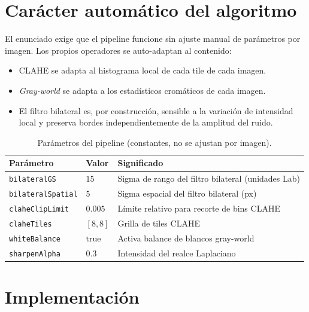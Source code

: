 \documentclass[11pt,a4paper]{article}
\begin{document}
\section{Carácter automático del algoritmo}
\label{sec:auto}

El enunciado exige que el pipeline funcione sin ajuste manual de parámetros por
imagen. Los propios operadores se auto-adaptan al contenido:

\begin{itemize}
    \item CLAHE se adapta al histograma local de cada tile de cada imagen.
    \item \emph{Gray-world} se adapta a los estadísticos cromáticos de cada imagen.
    \item El filtro bilateral es, por construcción, sensible a la variación de intensidad
          local y preserva bordes independientemente de la amplitud del ruido.
\end{itemize}

\begin{table}[H]
\centering
\caption{Parámetros del pipeline (constantes, no se ajustan por imagen).}
\label{tab:params}
\begin{tabular}{@{}lll@{}}
\toprule
Parámetro & Valor & Significado \\
\midrule
\texttt{bilateralGS}      & \(15\)       & Sigma de rango del filtro bilateral (unidades Lab) \\
\texttt{bilateralSpatial} & \(5\)        & Sigma espacial del filtro bilateral (px) \\
\texttt{claheClipLimit}   & \(0.005\)    & Límite relativo para recorte de bins CLAHE \\
\texttt{claheTiles}       & \([8,8]\)    & Grilla de tiles CLAHE \\
\texttt{whiteBalance}     & \(\text{true}\) & Activa balance de blancos gray-world \\
\texttt{sharpenAlpha}     & \(0.3\)      & Intensidad del realce Laplaciano \\
\bottomrule
\end{tabular}
\end{table}

\section{Implementación}
\label{sec:impl}
\end{document}
